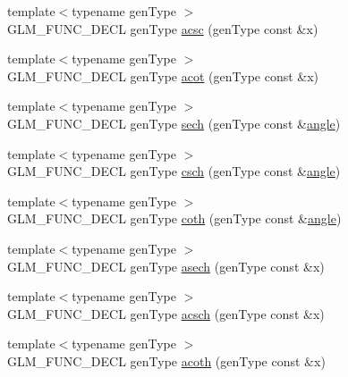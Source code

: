\begin{DoxyCompactItemize}
\item 
{\footnotesize template$<$typename gen\+Type $>$ }\\G\+L\+M\+\_\+\+F\+U\+N\+C\+\_\+\+D\+E\+C\+L gen\+Type \hyperlink{group__gtc__reciprocal_ga135e8f6b36bb85b5f7d8067e6b890e4d}{acsc} (gen\+Type const \&x)
\item 
{\footnotesize template$<$typename gen\+Type $>$ }\\G\+L\+M\+\_\+\+F\+U\+N\+C\+\_\+\+D\+E\+C\+L gen\+Type \hyperlink{group__gtc__reciprocal_ga97d029f989f849b62915b068c264246b}{acot} (gen\+Type const \&x)
\item 
{\footnotesize template$<$typename gen\+Type $>$ }\\G\+L\+M\+\_\+\+F\+U\+N\+C\+\_\+\+D\+E\+C\+L gen\+Type \hyperlink{group__gtc__reciprocal_gaaa698b992c63f454a3a1a1baa2773a3c}{sech} (gen\+Type const \&\hyperlink{group__gtc__quaternion_gad4a4448baedb198b2b1e7880d2544dc9}{angle})
\item 
{\footnotesize template$<$typename gen\+Type $>$ }\\G\+L\+M\+\_\+\+F\+U\+N\+C\+\_\+\+D\+E\+C\+L gen\+Type \hyperlink{group__gtc__reciprocal_ga00404a9cdf62023792d1d0afedd7f896}{csch} (gen\+Type const \&\hyperlink{group__gtc__quaternion_gad4a4448baedb198b2b1e7880d2544dc9}{angle})
\item 
{\footnotesize template$<$typename gen\+Type $>$ }\\G\+L\+M\+\_\+\+F\+U\+N\+C\+\_\+\+D\+E\+C\+L gen\+Type \hyperlink{group__gtc__reciprocal_gae2f1e6f7c360dda452b88e0c492d6f4d}{coth} (gen\+Type const \&\hyperlink{group__gtc__quaternion_gad4a4448baedb198b2b1e7880d2544dc9}{angle})
\item 
{\footnotesize template$<$typename gen\+Type $>$ }\\G\+L\+M\+\_\+\+F\+U\+N\+C\+\_\+\+D\+E\+C\+L gen\+Type \hyperlink{group__gtc__reciprocal_ga450f3bf1c04751198994d26d92ac2a63}{asech} (gen\+Type const \&x)
\item 
{\footnotesize template$<$typename gen\+Type $>$ }\\G\+L\+M\+\_\+\+F\+U\+N\+C\+\_\+\+D\+E\+C\+L gen\+Type \hyperlink{group__gtc__reciprocal_ga418b31539e1a69c262712f2c7a4f27eb}{acsch} (gen\+Type const \&x)
\item 
{\footnotesize template$<$typename gen\+Type $>$ }\\G\+L\+M\+\_\+\+F\+U\+N\+C\+\_\+\+D\+E\+C\+L gen\+Type \hyperlink{group__gtc__reciprocal_gad73911994e6bb6a06cc3ea1bd89201ab}{acoth} (gen\+Type const \&x)
\item 

\end{DoxyCompactItemize}
